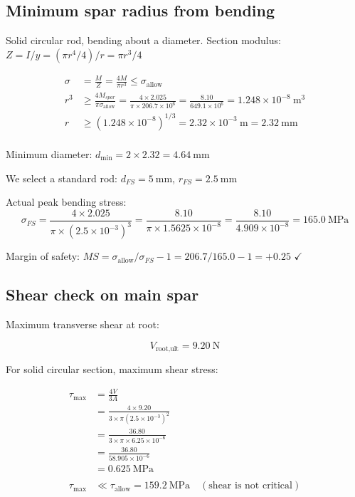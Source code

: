 \documentclass[10pt,a4paper]{article}
\begin{document}
\subsection{Minimum spar radius from bending}

Solid circular rod, bending about a diameter.  
Section modulus: $Z = I/y = (\pi r^4/4)/r = \pi r^3/4$

\begin{align*}
\sigma &= \frac{M}{Z} = \frac{4M}{\pi r^3} \leq \sigma_{\text{allow}}\\
r^3 &\geq \frac{4 M_{spar}}{\pi \sigma_{\text{allow}}} = \frac{4 \times 2.025}{\pi \times 206.7 \times 10^6} = \frac{8.10}{649.1 \times 10^6} = 1.248 \times 10^{-8}\ \text{m}^3 \\
r &\geq (1.248 \times 10^{-8})^{1/3} = 2.32 \times 10^{-3}\ \text{m} = 2.32\ \text{mm} \\
\end{align*}

Minimum diameter: $d_{\min} = 2 \times 2.32 = 4.64\ \text{mm}$

We select a standard rod: $d_{FS} = 5\ \text{mm}$, $r_{FS} = 2.5\ \text{mm}$

Actual peak bending stress:
\[
\sigma_{FS} = \frac{4 \times 2.025}{\pi \times (2.5 \times 10^{-3})^3} = \frac{8.10}{\pi \times 1.5625 \times 10^{-8}} = \frac{8.10}{4.909 \times 10^{-8}} = 165.0\ \text{MPa}
\]

Margin of safety: $MS = \sigma_{\text{allow}}/\sigma_{FS} - 1 = 206.7/165.0 - 1 = +0.25$ $\checkmark $

\subsection{Shear check on main spar}

Maximum transverse shear at root:

\[
V_{\text{root,ult}} = 9.20\ \text{N}
\]

For solid circular section, maximum shear stress:

\begin{align*}
\tau_{\max} &= \frac{4V}{3A} \\
&= \frac{4 \times 9.20}{3 \times \pi (2.5 \times 10^{-3})^2} \\
&= \frac{36.80}{3 \times \pi \times 6.25 \times 10^{-6}} \\
&= \frac{36.80}{58.905 \times 10^{-6}} \\
&= 0.625\ \text{MPa} \\
\\
\tau_{\max} &\ll \tau_{\text{allow}} = 159.2\ \text{MPa} 
\quad (\text{shear is not critical})
\end{align*}
\end{document}
